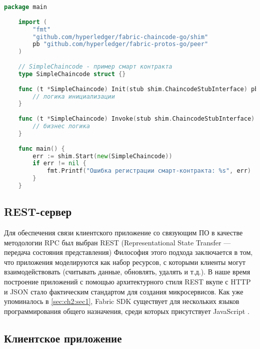 \begin{lstlisting}[caption={Реализация Chaincode},label={lst:chaincode-impl},language=Go]
	package main
	
	import (
		"fmt"
		"github.com/hyperledger/fabric-chaincode-go/shim"
		pb "github.com/hyperledger/fabric-protos-go/peer"
	)
	
	// SimpleChaincode - пример смарт контракта
	type SimpleChaincode struct {}
	
	func (t *SimpleChaincode) Init(stub shim.ChaincodeStubInterface) pb.Response {
		// логика инициализации
	}
	
	func (t *SimpleChaincode) Invoke(stub shim.ChaincodeStubInterface) pb.Response {
		// бизнес логика
	}
	
	func main() {
		err := shim.Start(new(SimpleChaincode))
		if err != nil {
			fmt.Printf("Ошибка регистрации смарт-контракта: %s", err)
		}
	}
\end{lstlisting}


\subsection{REST-сервер} \label{subsec:ch2/sec2/subsec3}
Для обеспечения связи клиентского приложение со связующим ПО в качестве методологии RPC был выбран REST (Representational State Transfer — передача состояния представления)\cite{restful} Философия этого подхода заключается в том, что приложения моделируются как набор ресурсов, с которыми клиенты могут взаимодействовать (считывать данные, обновлять, удалять и т.д.). В наше время построение приложений с помощью архитектурного стиля REST вкупе с HTTP и JSON \cite{js-json} стало фактическим стандартом для создания микросервисов.
Как уже упоминалось в \ref{sec:ch2:sec1}, Fabric SDK существует для нескольких языков программирования общего назначения, среди которых присутствует JavaScript \cite{pure-js}. 

\subsection{Клиентское приложение}
 \label{subsec:ch2/sec2/subsec3}
 

